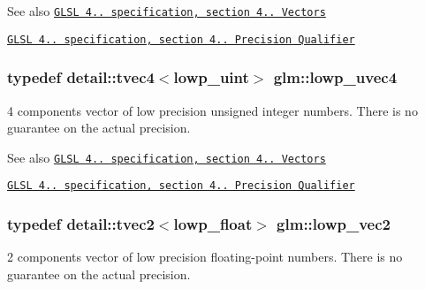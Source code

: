 \begin{DoxySeeAlso}{\-See also}
\href{http://www.opengl.org/registry/doc/GLSLangSpec.4.20.8.pdf}{\tt \-G\-L\-S\-L 4.. specification, section 4.. \-Vectors} 

\href{http://www.opengl.org/registry/doc/GLSLangSpec.4.20.8.pdf}{\tt \-G\-L\-S\-L 4.. specification, section 4.. \-Precision \-Qualifier} 
\end{DoxySeeAlso}
\hypertarget{group__core__precision_gae312816bc8b9b803de46b9fb2da036eb}{
\subsubsection[{lowp\-\_\-uvec4}]{\setlength{\rightskip}{0pt plus 5cm}typedef detail\-::tvec4$<$lowp\-\_\-uint$>$ {\bf glm\-::lowp\-\_\-uvec4}}}\label{group__core__precision_gae312816bc8b9b803de46b9fb2da036eb}
4 components vector of low precision unsigned integer numbers. \-There is no guarantee on the actual precision.

\begin{DoxySeeAlso}{\-See also}
\href{http://www.opengl.org/registry/doc/GLSLangSpec.4.20.8.pdf}{\tt \-G\-L\-S\-L 4.. specification, section 4.. \-Vectors} 

\href{http://www.opengl.org/registry/doc/GLSLangSpec.4.20.8.pdf}{\tt \-G\-L\-S\-L 4.. specification, section 4.. \-Precision \-Qualifier} 
\end{DoxySeeAlso}
\hypertarget{group__core__precision_ga158d9bb292b42c86b36e8eaff3b22394}{
\subsubsection[{lowp\-\_\-vec2}]{\setlength{\rightskip}{0pt plus 5cm}typedef detail\-::tvec2$<$lowp\-\_\-float$>$ {\bf glm\-::lowp\-\_\-vec2}}}\label{group__core__precision_ga158d9bb292b42c86b36e8eaff3b22394}
2 components vector of low precision floating-\/point numbers. \-There is no guarantee on the actual precision.

